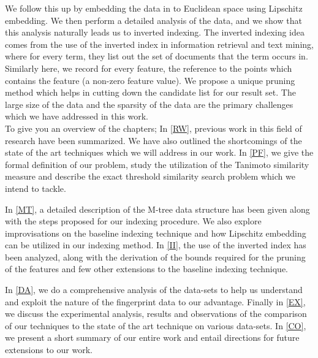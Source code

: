 We follow this up by embedding the data in to Euclidean space using Lipschitz embedding. We then perform a detailed analysis of the data, and we show that this analysis naturally leads us to inverted indexing. The inverted indexing idea comes from the use of the inverted index in information retrieval and text mining, where for every term, they list out the set of documents that the term occurs in. Similarly here, we record for every feature, the reference to the points which contains the feature (a non-zero feature value). We propose a unique pruning method which helps in cutting down the candidate list for our result set.  The large size of the data and the sparsity of the data are the primary challenges which we have addressed in this work.\\

To give you an overview of the chapters; In \autoref{RW}, previous work in this field of research have been summarized. We have also outlined the shortcomings of the state of the art techniques which we will address in our work. In \autoref{PF}, we give the formal definition of our problem, study the utilization of the Tanimoto similarity measure and describe the exact threshold similarity search problem which we intend to tackle.

In \autoref{MT}, a detailed description of the M-tree data structure has been given along with the steps proposed for our indexing procedure. We also explore improvisations on the baseline indexing technique and how Lipschitz embedding can be utilized in our indexing method. In \autoref{II}, the use of the inverted index has been analyzed, along with the derivation of the bounds required for the pruning of the features and few other extensions to the baseline indexing technique.

	In \autoref{DA}, we do a comprehensive analysis of the data-sets to help us understand and exploit the nature of the fingerprint data to our advantage. Finally in \autoref{EX}, we discuss the experimental analysis, results and observations of the comparison of our techniques to the state of the art technique on various data-sets. In \autoref{CO}, we present a short summary of our entire work and entail directions for future extensions to our work.



	